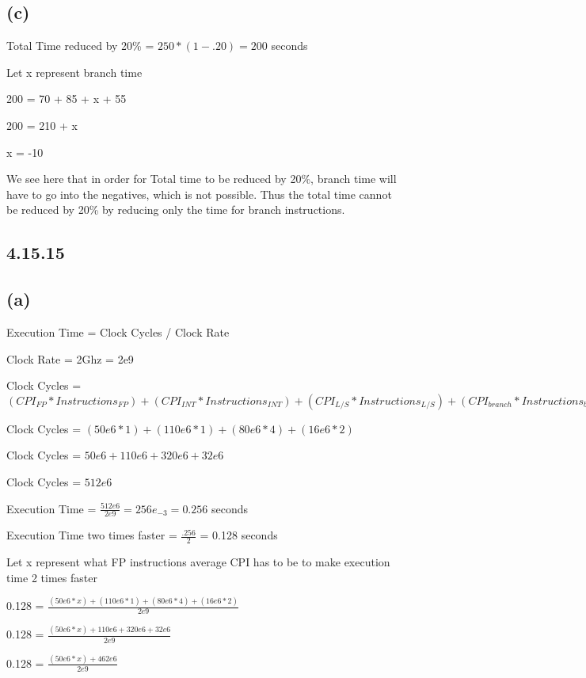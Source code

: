 \documentclass{article}
\begin{document}
    \subsection*{(c)}

    Total Time reduced by 20\% = $250 * (1-.20) = 200$ seconds

    Let x represent branch time

    200 = 70 + 85 + x + 55

    200 = 210 + x

    x = -10

    We see here that in order for Total time to be reduced by 20\%, branch time will have to go into the negatives, which is not possible. Thus the total time cannot be reduced by 20\% by reducing only the time for branch instructions.

    \subsection*{4.15.15}

    \subsection*{(a)}

    Execution Time = Clock Cycles / Clock Rate

    Clock Rate = 2Ghz = 2e9

    Clock Cycles = $(CPI_{FP} * Instructions_{FP}) + (CPI_{INT} * Instructions_{INT}) + (CPI_{L/S} * Instructions_{L/S}) + (CPI_{branch}* Instructions_{branch})$

    Clock Cycles = $(50e6 * 1) + (110e6 * 1) + (80e6 * 4) + (16e6 * 2)$

    Clock Cycles = $50e6 + 110e6 + 320e6 + 32e6$

    Clock Cycles = $512e6$

    Execution Time = $\frac{512e6}{2e9} = 256e_{-3} = 0.256$ seconds

    Execution Time two times faster = $\frac{.256}{2}$ = 0.128 seconds

    Let x represent what FP instructions average CPI has to be to make execution time 2 times faster

    0.128 = $\frac{(50e6 * x) + (110e6 * 1) + (80e6 * 4) + (16e6 * 2)}{2e9}$

    0.128 = $\frac{(50e6 * x) + 110e6 + 320e6 + 32e6}{2e9}$

    0.128 = $\frac{(50e6 * x) + 462e6}{2e9}$
\end{document}

